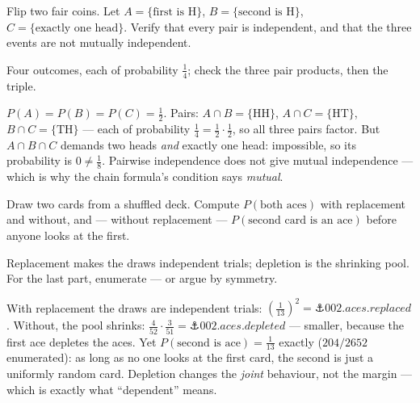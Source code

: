 \begin{problem}
Flip two fair coins. Let $A = \{\text{first is H}\}$,
$B = \{\text{second is H}\}$, $C = \{\text{exactly one head}\}$. Verify
that every pair is independent, and that the three events are not
mutually independent.
\begin{hint}
Four outcomes, each of probability $\tfrac14$; check the three pair
products, then the triple.
\end{hint}
\begin{solution}
$P(A) = P(B) = P(C) = \tfrac12$. Pairs: $A \cap B = \{\mathrm{HH}\}$,
$A \cap C = \{\mathrm{HT}\}$, $B \cap C = \{\mathrm{TH}\}$ — each of
probability $\tfrac14 = \tfrac12 \cdot \tfrac12$, so all three pairs
factor. But $A \cap B \cap C$ demands two heads \emph{and} exactly one
head: impossible, so its probability is $0 \neq \tfrac18$. Pairwise
independence does not give mutual independence — which is why the chain
formula's condition says \emph{mutual}.
\end{solution}
\end{problem}

\begin{problem}[stretch]
Draw two cards from a shuffled deck. Compute $P(\text{both aces})$ with
replacement and without, and — without replacement — $P(\text{second
card is an ace})$ before anyone looks at the first.
\begin{hint}
Replacement makes the draws independent trials; depletion is the
shrinking pool. For the last part, enumerate — or argue by symmetry.
\end{hint}
\begin{solution}
With replacement the draws are independent trials:
$\left(\tfrac{1}{13}\right)^2 = \anchor{002.aces.replaced}$. Without,
the pool shrinks: $\tfrac{4}{52} \cdot \tfrac{3}{51} =
\anchor{002.aces.depleted}$ — smaller, because the first ace depletes
the aces. Yet $P(\text{second is ace}) = \tfrac{1}{13}$ exactly
($204/2652$ enumerated): as long as no one looks at the first card, the
second is just a uniformly random card. Depletion changes the
\emph{joint} behaviour, not the margin — which is exactly what
``dependent'' means.
\end{solution}
\end{problem}
